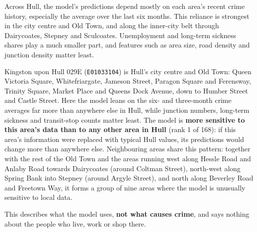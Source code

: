 Across Hull, the model's predictions depend mostly on each area's recent
crime history, especially the average over the last six months. This reliance
is strongest in the city centre and Old Town, and along the inner-city belt
through Dairycoates, Stepney and Sculcoates. Unemployment and long-term
sickness shares play a much smaller part, and features such as area size, road
density and junction density matter least.

Kingston upon Hull 029E (\texttt{E01033104}) is Hull's city centre and Old
Town: Queen Victoria Square, Whitefriargate, Jameson Street, Paragon Square and
Ferensway, Trinity Square, Market Place and Queens Dock Avenue, down to Humber
Street and Castle Street. Here the model leans on the six- and three-month crime
averages far more than anywhere else in Hull, while junction numbers,
long-term sickness and transit-stop counts matter least. The model is
\textbf{more sensitive to this area's data than to any other area in Hull}
(rank 1 of 168): if this area's information were replaced with typical Hull
values, its predictions would change more than anywhere else. Neighbouring
areas share this pattern: together with the rest of the Old Town and the
areas running west along Hessle Road and Anlaby Road towards Dairycoates
(around Coltman Street), north-west along Spring Bank into Stepney (around
Argyle Street), and north along Beverley Road and Freetown Way, it forms a
group of nine areas where the model is unusually sensitive to local data.

This describes what the model uses, \textbf{not what causes crime}, and says
nothing about the people who live, work or shop there.

